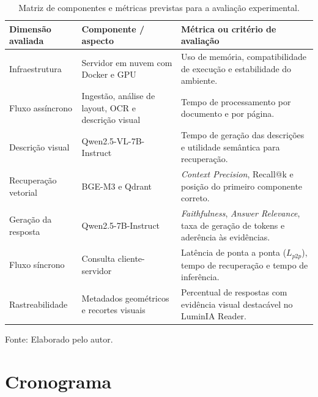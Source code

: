 \begin{table}[H]
\centering
\caption{Matriz de componentes e métricas previstas para a avaliação experimental.}
\label{tab:matriz_experimentos}

\renewcommand{\arraystretch}{1.3}
\begin{tabularx}{\textwidth}{|p{3.6cm}|p{4.2cm}|X|}
\hline
\textbf{Dimensão avaliada} & \textbf{Componente / aspecto} & \textbf{Métrica ou critério de avaliação} \\
\hline

Infraestrutura
& Servidor em nuvem com Docker e GPU
& Uso de memória, compatibilidade de execução e estabilidade do ambiente. \\
\hline

Fluxo assíncrono
& Ingestão, análise de layout, OCR e descrição visual
& Tempo de processamento por documento e por página. \\
\hline

Descrição visual
& Qwen2.5-VL-7B-Instruct
& Tempo de geração das descrições e utilidade semântica para recuperação. \\
\hline

Recuperação vetorial
& BGE-M3 e Qdrant
& \textit{Context Precision}, Recall@k e posição do primeiro componente correto. \\
\hline

Geração da resposta
& Qwen2.5-7B-Instruct
& \textit{Faithfulness}, \textit{Answer Relevance}, taxa de geração de tokens e aderência às evidências. \\
\hline

Fluxo síncrono
& Consulta cliente-servidor
& Latência de ponta a ponta ($L_{p2p}$), tempo de recuperação e tempo de inferência. \\
\hline

Rastreabilidade
& Metadados geométricos e recortes visuais
& Percentual de respostas com evidência visual destacável no LuminIA Reader. \\
\hline

\end{tabularx}

\vspace{0.2cm}
{\raggedright\footnotesize Fonte: Elaborado pelo autor.\par}
\end{table}

\section{Cronograma}
\label{sec:cronograma}

